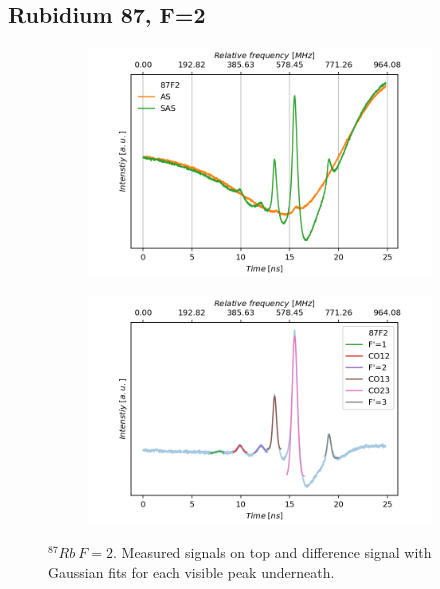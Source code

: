 \documentclass[]{article}
\begin{document}
\subsection{Rubidium 87, F=2}
\begin{figure}[H]
\centering
\begin{subfigure}{.7\textwidth}
\includegraphics[width=\linewidth]{Plots/87F2_Both.png}
\end{subfigure}

\begin{subfigure}[c]{.7\textwidth}
\includegraphics[width=\linewidth]{Plots/87F2_Diff.png}
\end{subfigure}
\caption{$^{87}Rb\ F=2 $. Measured signals on top and difference signal with Gaussian fits for each visible peak underneath.}
\label{fig: 87F2}
\end{figure}
\end{document}
